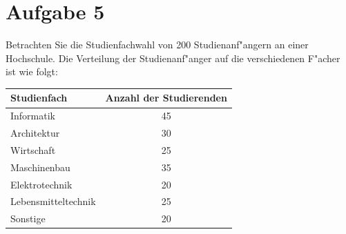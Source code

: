 \documentclass[10pt, a4paper, oneside]{article}
\begin{document}
\section{Aufgabe 5}

Betrachten Sie die Studienfachwahl von 200 Studienanf"angern an einer
Hochschule. Die Verteilung der Studienanf"anger auf die verschiedenen F"acher
ist wie folgt:

\begin{table}[h]
    \centering
    \begin{tabular}{l|c}
        \multicolumn{1}{l}{Studienfach} & \multicolumn{1}{c}{Anzahl der Studierenden} \\ \hline
        Informatik & 45 \\
        Architektur & 30 \\
        Wirtschaft & 25 \\
        Maschinenbau & 35 \\
        Elektrotechnik & 20 \\
        Lebensmitteltechnik & 25 \\
        Sonstige & 20
    \end{tabular}
\end{table}
\end{document}

